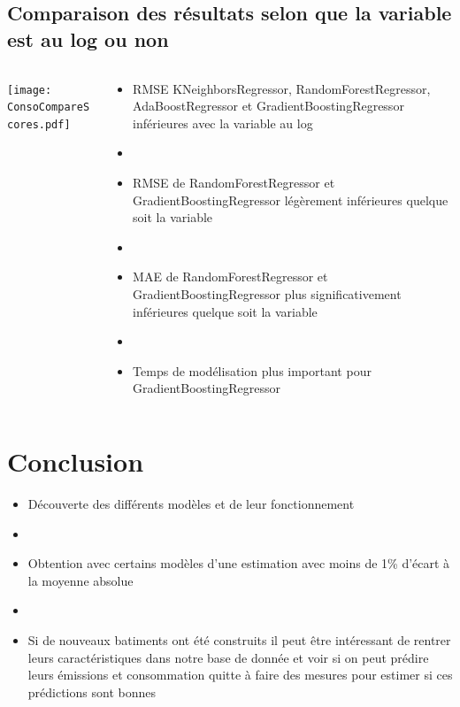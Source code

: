 \documentclass[8pt,aspectratio=169,hyperref={unicode=true}]{beamer}
\begin{document}
\subsection{Comparaison des résultats selon que la variable est au log ou non}
\begin{frame}{\insertsubsection}
  \begin{columns}
    \begin{column}{.5\textwidth}
      \centering
      \texttt{[image: ConsoCompareScores.pdf]}
    \end{column}
    \begin{column}{.5\textwidth}
      \begin{itemize}
        \item RMSE KNeighborsRegressor, RandomForestRegressor, AdaBoostRegressor et
              GradientBoostingRegressor inférieures avec la variable au log
        \item[]
        \item RMSE de RandomForestRegressor et GradientBoostingRegressor légèrement
              inférieures quelque soit la variable
        \item[]
        \item MAE de RandomForestRegressor et GradientBoostingRegressor plus significativement
              inférieures quelque soit la variable
        \item[]
        \item Temps de modélisation plus important pour GradientBoostingRegressor
      \end{itemize}
    \end{column}
  \end{columns}
\end{frame}

\section{Conclusion}
\begin{frame}{\insertsection}
  \begin{itemize}
    \item Découverte des différents modèles et de leur fonctionnement
    \item[]
    \item Obtention avec certains modèles d'une estimation avec moins de 1\% d'écart
          à la moyenne absolue
    \item[]
    \item Si de nouveaux batiments ont été construits il peut être intéressant de rentrer leurs
          caractéristiques dans notre base de donnée et voir si on peut prédire leurs émissions
          et consommation quitte à faire des mesures pour estimer si ces prédictions sont bonnes
  \end{itemize}
\end{frame}
\end{document}
